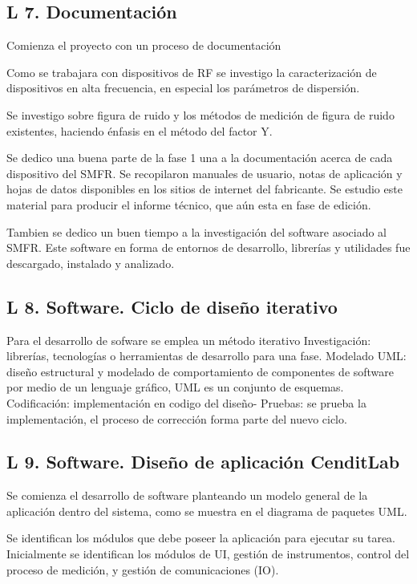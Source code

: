 \documentclass[paper=letter,oneside,fontsize=9pt]{scrartcl}
\begin{document}
	\subsection{L 7. Documentación}
	
	Comienza el proyecto con un proceso de documentación
	
	Como se trabajara con dispositivos de RF se investigo la caracterización de dispositivos en alta frecuencia, en especial los parámetros de dispersión.
	
	Se investigo sobre figura de ruido y los métodos de medición de figura de ruido existentes, haciendo énfasis en el método del factor Y.
	
	Se dedico una buena parte de la fase 1 una a la documentación acerca de cada dispositivo del SMFR. Se recopilaron manuales de usuario, notas de aplicación y hojas de datos disponibles en los sitios de internet del fabricante. Se estudio este material para producir el informe técnico, que aún esta en fase de edición.
	
	Tambien se dedico un buen tiempo a la investigación del software asociado al SMFR. Este software en forma de entornos de desarrollo, librerías y utilidades fue descargado, instalado y analizado.
	
	
	\subsection{L 8. Software. Ciclo de diseño iterativo}
	
	Para el desarrollo de sofware se emplea un método iterativo
	Investigación: librerías, tecnologías o herramientas de desarrollo para una fase.
	Modelado UML: diseño estructural y modelado de comportamiento de componentes de software por medio de un lenguaje gráfico, UML es un conjunto de esquemas.
	Codificación: implementación en codigo del diseño-
	Pruebas: se prueba la implementación, el proceso de corrección forma parte del nuevo ciclo.
	
	\subsection{L 9. Software. Diseño de aplicación CenditLab}
	
	Se comienza el desarrollo de software planteando un modelo general de la aplicación dentro del sistema, como se muestra en el diagrama de paquetes UML.
	
	Se identifican los módulos que debe poseer la aplicación para ejecutar su tarea. Inicialmente se identifican los módulos de UI, gestión de instrumentos, control del proceso de medición, y gestión de comunicaciones (IO).
	
\end{document}
